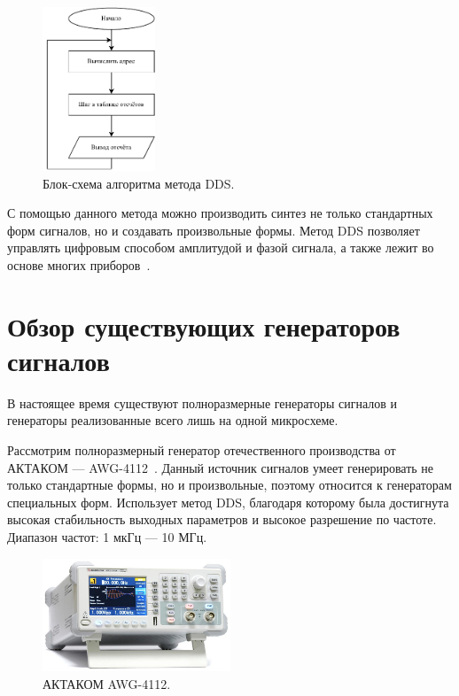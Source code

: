 	\begin{figure}[H]
    \centering
    \includegraphics[width=0.3\textwidth]{../image/dds_block.pdf}
    \caption{Блок-схема алгоритма метода DDS.}
	\end{figure}
	
	С помощью данного метода можно производить синтез не только стандартных форм сигналов, но и создавать произвольные формы. Метод DDS позволяет управлять цифровым способом амплитудой и фазой сигнала, а также лежит во основе многих приборов~\cite{dds_en}.
	
	
\section{Обзор существующих генераторов сигналов}
	В настоящее время существуют полноразмерные генераторы сигналов и генераторы реализованные всего лишь на одной микросхеме.
	
	Рассмотрим полноразмерный генератор отечественного производства от АКТАКОМ --- AWG-4112~\cite{aktakom}. Данный источник сигналов умеет генерировать не только стандартные формы, но и произвольные, поэтому относится к генераторам специальных форм. Использует метод DDS, благодаря которому была достигнута высокая стабильность выходных параметров и высокое разрешение по частоте. Диапазон частот: 1 мкГц --- 10 МГц.
	
	\begin{figure}[H]
    \centering
    \includegraphics[width=0.5\textwidth]{../image/AWG-4112.jpg}
    \caption{АКТАКОМ AWG-4112.}
	\end{figure}
	

